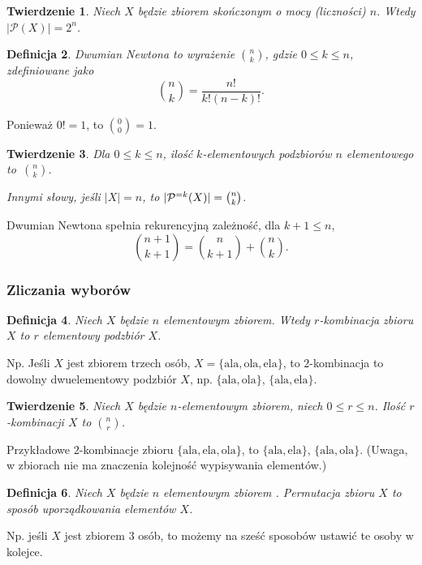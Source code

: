 \documentclass[12pt]{article}
\newcommand{\cP}{\mathcal{P}}
\newtheorem{thm}{Twierdzenie}
\newtheorem{dfn}[thm]{Definicja}
\newcommand{\ala}{\textrm{ala}}
\newcommand{\ela}{\textrm{ela}}
\newcommand{\ola}{\textrm{ola}}
\begin{document}
\begin{thm}
	Niech $X$ będzie zbiorem skończonym o mocy (liczności) $n$. 
	Wtedy $|\cP(X)|=2^n$.
\end{thm}

\begin{dfn}
	Dwumian Newtona to wyrażenie $\binom{n}{k}$, gdzie $0\leq k\leq n$, zdefiniowane jako
	\[
	\binom{n}{k}=\frac{n!}{k!(n-k)!}.
	\]
\end{dfn}
Ponieważ $0!=1$, to $\binom{0}{0}=1$.

\begin{thm}
	Dla $0\leq k \leq n$, ilość $k$-elementowych podzbiorów
	$n$ elementowego to~$\binom{n}{k}$. 
	
	Innymi słowy, jeśli $|X|=n$, 
	to $|\cP\sp{=k}(X)|=\binom{n}{k}$.
\end{thm}

Dwumian Newtona spełnia rekurencyjną zależność,
dla $k+1\leq n$, 
\[
\binom{n+1}{k+1} = \binom{n}{k+1} + \binom{n}{k}.  
\]

\subsubsection{Zliczania wyborów}


\begin{dfn}
	Niech $X$ będzie $n$ elementowym zbiorem.
	Wtedy $r$-kombinacja  zbioru $X$ to $r$ elementowy podzbiór $X$.
\end{dfn} 

Np. Jeśli $X$ jest zbiorem trzech osób,
$X=\{\ala, \ola, \ela \}$, to $2$-kombinacja
to dowolny dwuelementowy podzbiór $X$, 
np. $\{\ala, \ola \}$, $\{\ala, \ela\}$.

\begin{thm}
	Niech $X$ będzie $n$-elementowym zbiorem, niech $0\leq r\leq n$. Ilość $r$-kombinacji $X$ to $\binom{n}{r}$.
\end{thm}



Przykładowe $2$-kombinacje zbioru $\{\ala, \ela, \ola\}$,
to $\{\ala, \ela\}$, $\{\ala, \ola\}$.
(Uwaga, w zbiorach nie ma znaczenia kolejność wypisywania
elementów.)


\begin{dfn}
Niech $X$ będzie $n$ elementowym zbiorem .
Permutacja zbioru $X$ to sposób uporządkowania 
elementów $X$.
\end{dfn} 

Np. jeśli $X$ jest zbiorem $3$ osób, to możemy
na sześć sposobów ustawić te osoby w kolejce.
\end{document}
